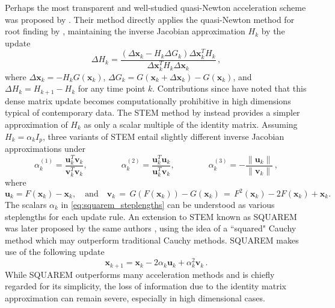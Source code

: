\documentclass{statsoc}
\newcommand{\bu}{\boldsymbol{u}}
\newcommand{\bv}{\boldsymbol{v}}
\newcommand{\bx}{\boldsymbol{x}}
\newcommand{\jx}[1]{{\color{blue}{ #1}}}
\begin{document}
Perhaps the most transparent and well-studied quasi-Newton acceleration scheme was proposed by \cite{jamshidian1997acceleration}. Their method directly applies the quasi-Newton method for root finding by \cite{broyden1965class}, maintaining the inverse Jacobian approximation $H_k$ by the update
\[
\Delta H_k = \dfrac{(\Delta \bx_k - H_k \Delta G_k)\Delta \bx_k^T H_k}{\Delta \bx_k^T H_k \Delta \bx_k}\,,
\]
where $\Delta \bx_k = -H_k G(\bx_k)$, $\Delta G_k = G(\bx_k + \Delta \bx_{k}) - G(\bx_k)$, and $\Delta H_k = H_{k+1} - H_k$ for any time point $k$. Contributions since have noted that this dense matrix update becomes computationally prohibitive in high dimensions typical of contemporary data. The STEM method by \cite{varadhan2008simple} instead provides a simpler approximation of $H_k$ as only a scalar multiple of the identity matrix. Assuming $H_k = \alpha_k I_p$, three variants of STEM entail slightly different inverse Jacobian approximations under %
\begin{equation} \label{eq:squarem_steplengths}
    \alpha_k^{(1)} = \dfrac{\bu_k^T \bv_k}{\bv_k^T \bv_k}, \qquad\qquad \alpha_k^{(2)} = \dfrac{\bu_k^T\bu_k}{\bu_k^T \bv_k}, \qquad\qquad \alpha_k^{(3)} = -\dfrac{ \|\bu_k\|}{\|\bv_k\|}\,,
\end{equation}
where 
$$\bu_k = F(\bx_k) - \bx_k, \quad \text{and} \quad \bv_k \, = \, G(F(\bx_k)) - G(\bx_k) \, = \,F^2(\bx_k) - 2F(\bx_k) + \bx_k.$$ The scalars $\alpha_k$ in \eqref{eq:squarem_steplengths} can be understood as various steplengths for each update rule. An extension to STEM known as SQUAREM was later proposed by the same authors \citep{varadhan2008simple}, using the idea of a ``squared" Cauchy method which may outperform traditional Cauchy methods. SQUAREM makes use of the following update
\[
\bx_{k+1} = \bx_k - 2\alpha_k\bu_k + \alpha_k^2\bv_k\,.
\] 
While SQUAREM outperforms many acceleration methods and is chiefly regarded for its simplicity, the loss of information due to the identity matrix approximation can remain severe, especially in high dimensional cases. 
\end{document}
